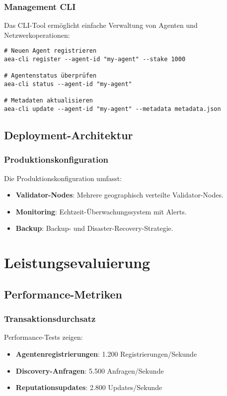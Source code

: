 \documentclass[12pt,a4paper]{article}
\begin{document}
\subsubsection{Management CLI}

Das CLI-Tool ermöglicht einfache Verwaltung von Agenten und Netzwerkoperationen:

\begin{verbatim}
# Neuen Agent registrieren
aea-cli register --agent-id "my-agent" --stake 1000

# Agentenstatus überprüfen
aea-cli status --agent-id "my-agent"

# Metadaten aktualisieren
aea-cli update --agent-id "my-agent" --metadata metadata.json
\end{verbatim}

\subsection{Deployment-Architektur}

\subsubsection{Produktionskonfiguration}

Die Produktionskonfiguration umfasst:

\begin{itemize}
\item \textbf{Validator-Nodes}: Mehrere geographisch verteilte Validator-Nodes.
\item \textbf{Monitoring}: Echtzeit-Überwachungssystem mit Alerts.
\item \textbf{Backup}: Backup- und Disaster-Recovery-Strategie.
\end{itemize}

\section{Leistungsevaluierung}

\subsection{Performance-Metriken}

\subsubsection{Transaktionsdurchsatz}

Performance-Tests zeigen:
\begin{itemize}
\item \textbf{Agentenregistrierungen}: 1.200 Registrierungen/Sekunde
\item \textbf{Discovery-Anfragen}: 5.500 Anfragen/Sekunde
\item \textbf{Reputationsupdates}: 2.800 Updates/Sekunde
\end{itemize}
\end{document}

